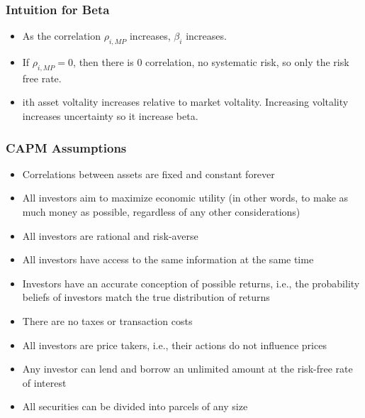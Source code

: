     \subsubsection{Intuition for Beta}
    \begin{intuition}
        \begin{itemize}
            \item As the correlation $\rho_{i, MP}$ increases, $\beta_i$ increases.
            \item If $\rho_{i, MP}=0$, then there is 0 correlation, no systematic risk, so only the risk free rate. 
            \item ith asset voltality increases relative to market voltality. Increasing voltality increases uncertainty so it increase beta. 
        \end{itemize}
    \end{intuition}

    \subsubsection{CAPM Assumptions}
    \begin{intuition}
        \begin{itemize}
            \item Correlations between assets are fixed and constant forever
            \item All investors aim to maximize economic utility (in other words, to make as much money as possible, regardless of any other considerations)
            \item All investors are rational and risk-averse
            \item All investors have access to the same information at the same time
            \item Investors have an accurate conception of possible returns, i.e., the probability beliefs of investors match the true distribution of returns
            \item There are no taxes or transaction costs
            \item All investors are price takers, i.e., their actions do not influence prices
            \item Any investor can lend and borrow an unlimited amount at the risk-free rate of interest
            \item All securities can be divided into parcels of any size
        \end{itemize}
    \end{intuition}


